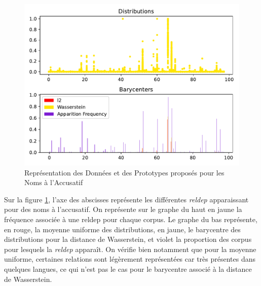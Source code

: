 \documentclass{cours}
\begin{document}
\begin{figure}
\centering
\includegraphics{Figures/Visualisations/Nouns_Wasserstein_Barycenter_Acc}
\caption{Représentation des Données et des Prototypes proposés pour les Noms à l'Accusatif}
\label{fig_proto}
\end{figure}

Sur la figure \ref{fig_proto}, l'axe des abscisses représente les différentes \textit{reldep} apparaissant pour des noms à l'accusatif.
On représente sur le graphe du haut en jaune la fréquence associée à une reldep pour chaque corpus.
Le graphe du bas représente, en rouge, la moyenne uniforme des distributions, en jaune, le barycentre des distributions pour la distance de Wasserstein, et violet la proportion des corpus pour lesquels la \textit{reldep} apparaît.
On vérifie bien notamment que pour la moyenne uniforme, certaines relations sont légèrement représentées car très présentes dans quelques langues, ce qui n'est pas le cas pour le barycentre associé à la distance de Wasserstein.
\end{document}
